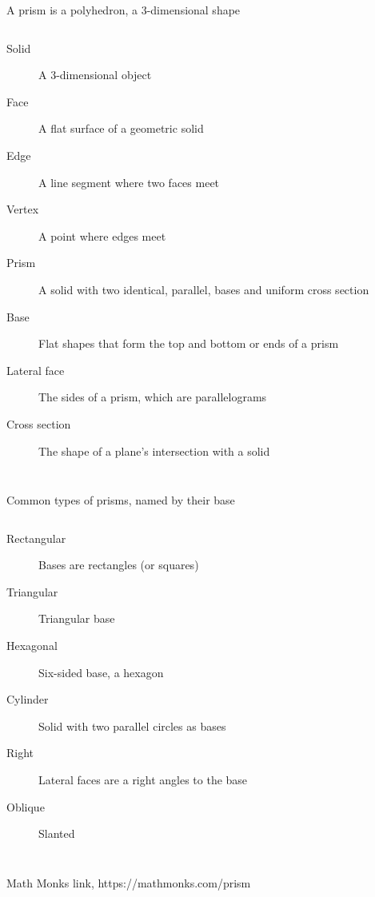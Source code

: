 \begin{frame}{A prism is a polyhedron, a 3-dimensional shape}
    \begin{columns}
      \begin{description}
        \item[Solid] A 3-dimensional object
        \item[Face] A flat surface of a geometric solid
        \item[Edge] A line segment where two faces meet
        \item[Vertex] A point where edges meet 
        \item[Prism] A solid with two identical, parallel, bases and uniform cross section
        \item[Base] Flat shapes that form the top and bottom or ends of a prism
        \item[Lateral face] The sides of a prism, which are parallelograms
        \item[Cross section] The shape of a plane's intersection with a solid
      \end{description}
    \end{columns} \vspace{0.5cm}
  \end{frame}

\begin{frame}{Common types of prisms, named by their base}
  \begin{columns}
    \begin{description}
      \item[Rectangular] Bases are rectangles (or squares)
      \item[Triangular] Triangular base
      \item[Hexagonal] Six-sided base, a hexagon
      \item[Cylinder] Solid with two parallel circles as bases 
      \item[Right] Lateral faces are a right angles to the base
      \item[Oblique] Slanted
    \end{description}
  \end{columns} \vspace{0.5cm}
  Math Monks link, https://mathmonks.com/prism
\end{frame}

